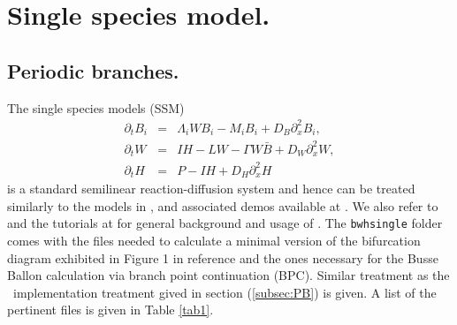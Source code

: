 \documentclass[a4paper,12pt]{article}
\begin{document}
\section{Single species model.}
\subsection{Periodic branches.}
The single species 
models (SSM) 
\begin{subequations}\label{eq:SSM}
\begin{eqnarray}
    \partial_t B_i &=& \Lambda_i W B_i - M_i B_i + D_B \partial^2_x B_i,\\
    \partial_t W &=& I H - L W - \Gamma W \bar{B} + D_W \partial^2_x W,\\
    \partial_t H &=& P - I H + D_H \partial^2_x H 
\end{eqnarray}    
\end{subequations}
is a standard semilinear reaction-diffusion system and hence can be treated similarly to the models in \cite[Ch.9]{uecker2021numerical}, and associated demos 
available at \cite{p2phome}. We also refer to 
\cite{uecker2021numerical,uecker2019pattern} and the tutorials at \cite{p2phome} for general 
background and usage of \pdep. The {\tt bwhsingle} folder comes with the files needed to calculate a minimal version of the bifurcation diagram exhibited in Figure 1 in reference \cite{FPBUM24} and the ones necessary for the Busse Ballon calculation via branch point continuation (BPC). Similar treatment as the \pdep \, implementation treatment gived in section (\ref{subsec:PB}) is given. A list of the pertinent files is given in Table \ref{tab1}. 
\end{document}
